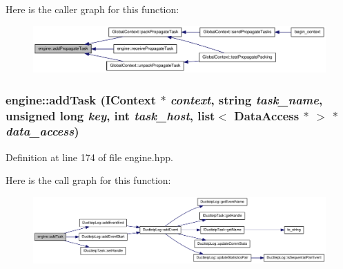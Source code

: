 Here is the caller graph for this function:\nopagebreak
\begin{figure}[H]
\begin{center}
\leavevmode
\includegraphics[width=364pt]{classengine_a9d0024f21ae5fa522fefdd38eade0a2e_icgraph}
\end{center}
\end{figure}
\hypertarget{classengine_aa22a2fc88b7283b840e6db1e45dbdd5b}{
\subsubsection[{addTask}]{ engine::addTask ({\bf IContext} $\ast$ {\em context}, \/  string {\em task\_\-name}, \/  unsigned long {\em key}, \/  int {\em task\_\-host}, \/  list$<$ {\bf DataAccess} $\ast$ $>$ $\ast$ {\em data\_\-access})}}
\label{classengine_aa22a2fc88b7283b840e6db1e45dbdd5b}


Definition at line 174 of file engine.hpp.

Here is the call graph for this function:\nopagebreak
\begin{figure}[H]
\begin{center}
\leavevmode
\includegraphics[width=420pt]{classengine_aa22a2fc88b7283b840e6db1e45dbdd5b_cgraph}
\end{center}
\end{figure}


